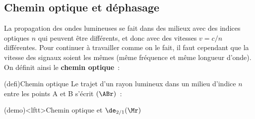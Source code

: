 \documentclass[../../main/main.tex]{subfiles}
\begin{document}
\subsection{Chemin optique et déphasage}
La propagation des ondes lumineuses se fait dans des milieux avec des indices
optiques $n$ qui peuvent être différents, et donc avec des vitesses $v = c/n$
différentes. Pour continuer à travailler comme on le fait, il faut cependant que
la vitesse des signaux soient les mêmes (même fréquence et même longueur d'onde).
On définit ainsi le \textbf{chemin optique}~:
\begin{tcb*}(defi){Chemin optique}
	Le trajet d'un rayon lumineux dans un milieu d'indice $n$ entre les points A
	et B s'écrit $(\ABr)$~:
	\psw{
		\[
			\boxed{(\ABr) = n \cdot \ABr}
		\]
	}
	\vspace{-15pt}
\end{tcb*}

\begin{tcb}(demo)<lftt>{Chemin optique et $\de_{2/1}(\Mr)$}
	\vspace{-15pt}
\end{tcb}
\end{document}
